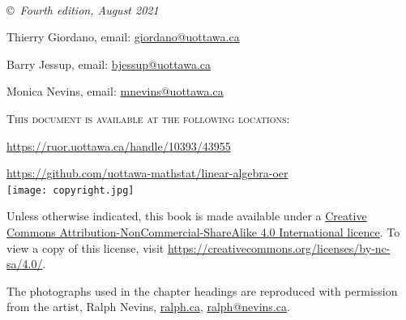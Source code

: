 \documentclass[11pt]{book} %
\begin{document}

\newpage
~\vfill
\thispagestyle{empty}





\noindent \copyright\ \textit{Fourth edition, August 2021} %



\smallskip
\noindent Thierry Giordano, email:
\href{mailto:giordano@uottawa.ca}{giordano@uottawa.ca}



\smallskip
\noindent Barry Jessup, email:
\href{mailto:bjessup@uottawa.ca}{bjessup@uottawa.ca}


\smallskip

\noindent Monica Nevins, email:
\href{mailto:mnevins@uottawa.ca}{mnevins@uottawa.ca}

\smallskip

\noindent \textsc{This document is available at the following locations:}

\href{https://ruor.uottawa.ca/handle/10393/43955}{https://ruor.uottawa.ca/handle/10393/43955}

\href{https://github.com/uottawa-mathstat/linear-algebra-oer}{https://github.com/uottawa-mathstat/linear-algebra-oer}  \\%



\noindent \texttt{[image: copyright.jpg]}

\noindent Unless otherwise indicated, this book is made available under a \href{https://creativecommons.org/licenses/by-nc-sa/4.0/}{Creative Commons Attribution-NonCommercial-ShareAlike 4.0 International licence}.  To view a copy of this license, visit \url{https://creativecommons.org/licenses/by-nc-sa/4.0/}.

\noindent The photographs used in the chapter headings are reproduced with permission from the artist, Ralph Nevins, \url{ralph.ca}, \href{mailto:ralph@nevins.ca}{ralph@nevins.ca}.

\vspace{1in}

\end{document}
